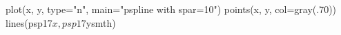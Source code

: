 \begin{Schunk}
\begin{Sinput}
 plot(x, y, type="n", main="pspline with spar=10")
 points(x, y, col=gray(.70))
 lines(psp17$x, psp17$ysmth)
\end{Sinput}
\end{Schunk}
